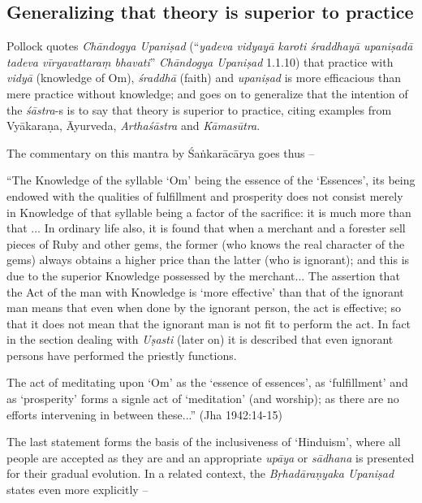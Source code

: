 \subsection{Generalizing that theory is superior to practice}\label{art12-sec3.5}

Pollock quotes {\sl Chāndogya Upaniṣad} (``{\sl yadeva vidyayā karoti śraddhayā upaniṣadā tadeva vīryavattaraṃ bhavati}'' {\sl Chāndogya Upaniṣad} 1.1.10) that practice with {\sl vidyā} (knowledge of Om), {\sl śraddhā} (faith) and {\sl upaniṣad} is more eﬃcacious than mere practice without knowledge; and goes on to generalize that the intention of the {\sl śāstra}-s is to say that theory is superior to practice, citing examples from Vyākaraṇa, Āyurveda, {\sl Arthaśāstra} and {\sl Kāmasūtra}.
\begin{myquote}
The commentary on this mantra by Śaṅkarācārya goes thus --

``The Knowledge of the syllable `Om' being the essence of the `Essences', its being endowed with the qualities of fulﬁllment and prosperity does not consist merely in Knowledge of that syllable being a factor of the sacriﬁce: it is much more than that ... In ordinary life also, it is found that when a merchant and a forester sell pieces of Ruby and other gems, the former (who knows the real character of the gems) always obtains a higher price than the	latter (who is ignorant); and this is due to the superior Knowledge possessed by the merchant... The assertion that the Act of the man with Knowledge is `more effective' than that of the ignorant man means that even when done by the ignorant person, the act is effective; so that it does not mean that the ignorant man is not ﬁt to perform the act. In fact in the section dealing with {\sl Uṣasti} (later on) it is described that even ignorant persons have performed the priestly functions.

The act of meditating upon `Om' as the `essence of essences', as `fulfillment' and as `prosperity' forms a signle act of `meditation' (and worship); as there are no efforts intervening in between these...'' (Jha 1942:14-15)
\end{myquote}

The last statement forms the basis of the inclusiveness of `Hinduism', where all people are accepted as they are and an appropriate {\sl upāya} or {\sl sādhana} is presented for their gradual evolution. In a related context, the {\sl Bṛhadāraṇyaka Upaniṣad} states even more explicitly --

